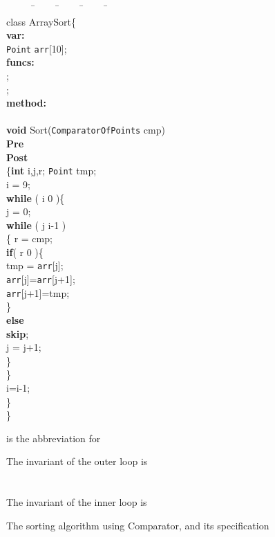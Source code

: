 \documentclass[fleqn]{llncs}
\begin{document}
\begin{figure}
\begin{boxedminipage}{0.5\textwidth}
{\scriptsize
\begin{tabbing}
\mbox{}\ \ \ \ \ \=\ \ \ \ \ \=\ \ \ \ \ \=\ \ \ \ \ \=\ \ \ \ \ \=\\
class ArraySort\{\\
\textbf{var:}\\
    \>\texttt{Point} \verb"arr"[10];\\
\textbf{funcs:}\\
    \>;\\
    \>;\\
\textbf{method:}\\
    \>\\
    \>\textbf{void} Sort(\texttt{ComparatorOfPoints} cmp)\\
    \>\textbf{Pre}\ \   \\
    \>\textbf{Post}  \\
    \>\{\>\textbf{int} i,j,r; \texttt{Point} tmp;\\
    \>  \>i = 9;\\
    \>  \>\textbf{while} ( i  0 )\{\\
    \>  \>    \>j = 0;\\
    \>  \>    \>\textbf{while} ( j  i-1 )\\
    \>  \>    \>\{\> r = cmp;\\
    \>  \>    \>  \>\textbf{if}( r  0 )\{\\
    \>  \>    \>  \>  \>tmp = \verb"arr"[j];\\
    \>  \>    \>  \>  \>\verb"arr"[j]=\verb"arr"[j+1];\\
    \>  \>    \>  \>  \>\verb"arr"[j+1]=tmp;\\
    \>  \>    \>  \>\}\\
    \>  \>    \>  \>\textbf{else}\\
    \>  \>    \>  \>  \>\textbf{skip};\\
    \>  \>    \>  \>j = j+1;\\
    \>  \>    \>\}\\
    \>  \>\}\\
    \>  \>i=i-1;\\
    \>  \}\\
\}\\
\end{tabbing}
}
\end{boxedminipage}
\begin{minipage}{0.4\textwidth}
{\scriptsize
 is the abbreviation for


The invariant of the outer loop is\\

\\
\\
The invariant of the inner loop is\\

}
\end{minipage}
\caption{The sorting algorithm using Comparator, and its specification}\label{FIG-COMPARATOR-CONTEXT}
\end{figure}
\end{document}
